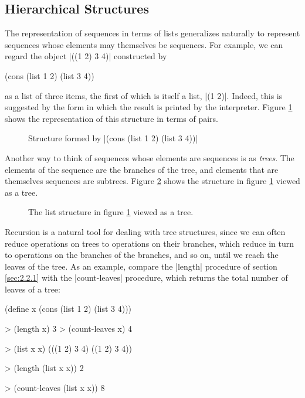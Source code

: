 \subsection{Hierarchical Structures}
\label{sec:2.2.2}

The representation of sequences in terms of lists generalizes
naturally to represent sequences whose elements may
themselves be sequences.  For example, we can regard the object
\scheme|((1 2) 3 4)| constructed by

\begin{schemedisplay}
(cons (list 1 2) (list 3 4))
\end{schemedisplay}
as a list of three items, the first of which is itself a list,
\scheme|(1 2)|.  Indeed, this is suggested by the form in which the
result is printed by the interpreter.  Figure \ref{fig:2.5} shows the
representation of this structure in terms of pairs.

\begin{schemeregion}
  \begin{figure}
    \centering
    \caption{Structure formed by \scheme|(cons (list 1 2) (list 3 4))|}
    \label{fig:2.5}
  \end{figure}
\end{schemeregion}

Another way to think of sequences whose elements are sequences is as
\textit{trees}.  The elements of the sequence are the branches of the
tree, and elements that are themselves sequences are subtrees.  Figure
\ref{fig:2.6} shows the structure in figure \ref{fig:2.5} viewed as a
tree.

\begin{figure}
  \centering
  \caption{The list structure in figure \ref{fig:2.5} viewed as a tree.}
  \label{fig:2.6}
\end{figure}

Recursion is a natural tool for dealing with tree structures, since we
can often reduce operations on trees to operations on their branches,
which reduce in turn to operations on the branches of the branches,
and so on, until we reach the leaves of the tree.  As an example,
compare the \scheme|length| procedure of section \ref{sec:2.2.1} with
the \scheme|count-leaves| procedure, which returns the total number of
leaves of a tree:


\begin{schemedisplay}
(define x (cons (list 1 2) (list 3 4)))

> (length x)
3
> (count-leaves x)
4

> (list x x)
(((1 2) 3 4) ((1 2) 3 4))

> (length (list x x))
2

> (count-leaves (list x x))
8
\end{schemedisplay}

